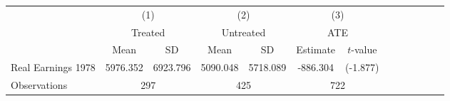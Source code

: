 {
\def\sym#1{\ifmmode^{#1}\else\(^{#1}\)\fi}
\begin{tabular}{l*{3}{cccc}}
\hline\hline
                    &\multicolumn{2}{c}{(1)}  &\multicolumn{2}{c}{(2)}  &\multicolumn{2}{c}{(3)}           \\
                    &\multicolumn{2}{c}{Treated}&\multicolumn{2}{c}{Untreated}&\multicolumn{2}{c}{ATE}           \\
                    & Mean & SD & Mean & SD & Estimate & $t$-value \\
\hline
Real Earnings 1978  &    5976.352&    6923.796&    5090.048&    5718.089&    -886.304         &    (-1.877)\\
\hline
Observations        &  \multicolumn{2}{c}{297} & \multicolumn{2}{c}{425} & \multicolumn{2}{c}{722} \\
\hline\hline
\end{tabular}
}
